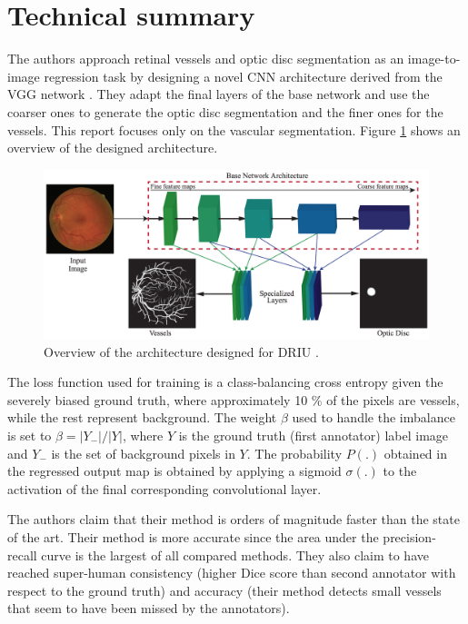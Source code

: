 \section{Technical summary}


The authors approach retinal vessels and optic disc segmentation as an image-to-image regression task by designing a novel CNN architecture derived from the VGG network \cite{simonyan_very_2014}. They adapt the final layers of the base network and use the coarser ones to generate the optic disc segmentation and the finer ones for the vessels. This report focuses only on the vascular segmentation. Figure \ref{fig:driu} shows an overview of the designed architecture.

\begin{figure}[H]
  \includegraphics[width=\textwidth]{figures/driu}
  \caption{Overview of the architecture designed for DRIU \cite{maninis_deep_2016}.} \label{fig:driu}
\end{figure}

The loss function used for training is a class-balancing cross entropy given the severely biased ground truth, where approximately 10 \% of the pixels are vessels, while the rest represent background. The weight $\beta$ used to handle the imbalance is set to $\beta = |Y_-| / |Y|$, where $Y$ is the ground truth (first annotator) label image and $Y_-$ is the set of background pixels in $Y$. The probability $P(.)$ obtained in the regressed output map is obtained by applying a sigmoid $\sigma(.)$ to the activation of the final corresponding convolutional layer.

The authors claim that their method is orders of magnitude faster than the state of the art. Their method is more accurate since the area under the precision-recall curve is the largest of all compared methods. They also claim to have reached super-human consistency (higher Dice score than second annotator with respect to the ground truth) and accuracy (their method detects small vessels that seem to have been missed by the annotators).
